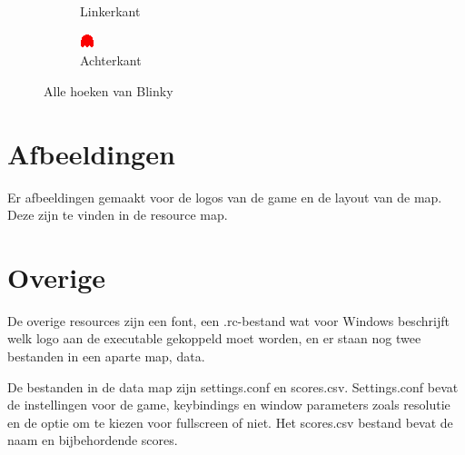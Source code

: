 \documentclass{report}
\begin{document}
\begin{figure}[!ht]
\begin{subfigure}{.24\textwidth}
      \caption{Linkerkant}
    \end{subfigure}
    \begin{subfigure}{.24\textwidth}
      \includegraphics[width=\linewidth]{technisch verslag imgs/blinky_back_one.png}
      \caption{Achterkant}
    \end{subfigure}
    \caption{Alle hoeken van Blinky}
  \end{figure}

  \section{Afbeeldingen} %
  \label{sec:afbeeldingen}
  Er afbeeldingen gemaakt voor de logos van de game en de layout van de map. Deze zijn te vinden in de resource map.

  \section{Overige} %
  \label{sec:overige}
  De overige resources zijn een font, een .rc-bestand wat voor Windows beschrijft welk logo aan de executable gekoppeld moet worden, en er staan nog twee bestanden in een aparte map, data.

  De bestanden in de data map zijn settings.conf en scores.csv. Settings.conf bevat de instellingen voor de game, keybindings en window parameters zoals resolutie en de optie om te kiezen voor fullscreen of niet. Het scores.csv bestand bevat de naam en bijbehordende scores.
\end{document}
